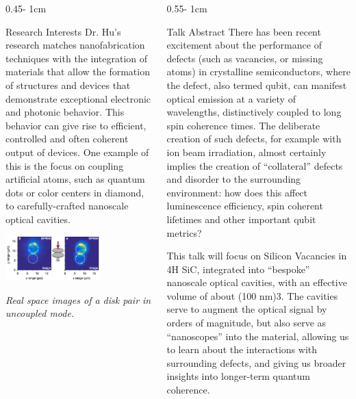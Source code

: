 \documentclass{../psuposter}
\begin{document}
\begin{frame}
\begin{columns}[t, totalwidth=\textwidth]
\begin{column}{0.45\textwidth - 1cm}
    \begin{block}{Research Interests}
        Dr. Hu's research matches nanofabrication techniques with the integration of materials that allow the formation of structures and devices that demonstrate exceptional electronic and photonic behavior. This behavior can give rise to efficient, controlled and often coherent output of devices. One example of this is the focus on coupling artificial atoms, such as quantum dots or color centers in diamond, to carefully-crafted nanoscale optical cavities. 
        \begin{center}
	    	\includegraphics[width=0.65\textwidth]{images/research}    		

    	\textit{Real space images of a disk pair in uncoupled mode. \cite{seyfferleSignaturesSinglephotonInteraction2018}} 
    	\end{center}
    \end{block}
\end{column}
\begin{column}{0.55\textwidth - 1cm}


    \begin{block}{Talk Abstract}
    	There has been recent excitement about the performance of defects (such as vacancies, or missing atoms) in crystalline semiconductors, where the defect, also termed qubit, can manifest optical emission at a variety of wavelengths, distinctively coupled to long spin coherence times. The deliberate creation of such defects, for example with ion beam irradiation, almost certainly implies the creation of “collateral” defects and disorder to the surrounding environment: how does this affect luminescence efficiency, spin coherent lifetimes and other important qubit metrics?

		This talk will focus on Silicon Vacancies in 4H SiC, integrated into “bespoke” nanoscale optical cavities, with an effective volume of about (100 nm)3. The cavities serve to augment the optical signal by orders of magnitude, but also serve as “nanoscopes” into the material, allowing us to learn about the interactions with surrounding defects, and giving us broader insights into longer-term quantum coherence.
    \end{block}



\end{column}
\end{columns}
\end{frame}
\end{document}
